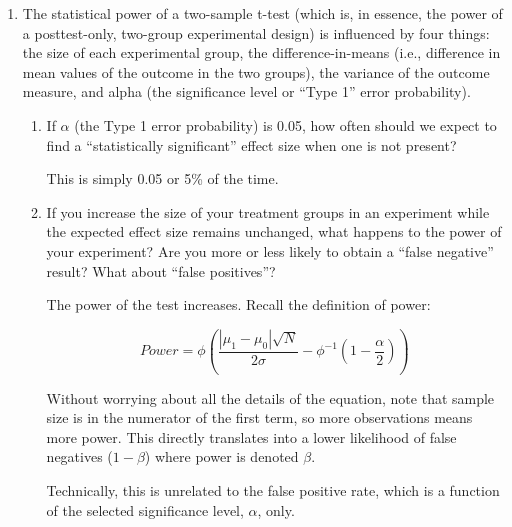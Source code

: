 \documentclass[a4paper]{exam}
\begin{document}
\begin{enumerate}
\begin{enumerate}
\begin{solution}
\end{solution}

\end{enumerate}

\item The statistical power of a two-sample t-test (which is, in essence, the power of a posttest-only, two-group experimental design) is influenced by four things: the size of each experimental group, the difference-in-means (i.e., difference in mean values of the outcome in the two groups), the variance of the outcome measure, and alpha (the significance level or ``Type 1'' error probability).

	\begin{enumerate}
	\item If $\alpha$ (the Type 1 error probability) is 0.05, how often should we expect to find a ``statistically significant'' effect size when one is not present?
	
	\begin{solution}
	
	This is simply 0.05 or 5\% of the time.
	
	\end{solution}
	
	\item If you increase the size of your treatment groups in an experiment while the expected effect size remains unchanged, what happens to the power of your experiment? Are you more or less likely to obtain a ``false negative'' result? What about ``false positives''?
	
	\begin{solution}
	
	The power of the test increases. Recall the definition of power:
	
	\begin{equation}
	Power = \phi\left( \frac{|\mu_1 - \mu_0|\sqrt{N}}{2\sigma} - \phi^{-1}\left( 1 - \frac{\alpha}{2} \right) \right)
	\end{equation}
	
	Without worrying about all the details of the equation, note that sample size is in the numerator of the first term, so more observations means more power. This directly translates into a lower likelihood of false negatives ($1-\beta$) where power is denoted $\beta$.
	
	Technically, this is unrelated to the false positive rate, which is a function of the selected significance level, $\alpha$, only.
	
	\end{solution}
	

\end{enumerate}
\end{enumerate}
\end{document}
